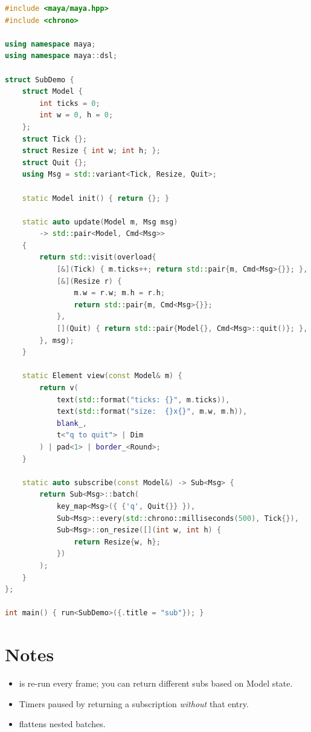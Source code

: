 \begin{lstlisting}[language=C++]
#include <maya/maya.hpp>
#include <chrono>

using namespace maya;
using namespace maya::dsl;

struct SubDemo {
    struct Model {
        int ticks = 0;
        int w = 0, h = 0;
    };
    struct Tick {};
    struct Resize { int w; int h; };
    struct Quit {};
    using Msg = std::variant<Tick, Resize, Quit>;

    static Model init() { return {}; }

    static auto update(Model m, Msg msg)
        -> std::pair<Model, Cmd<Msg>>
    {
        return std::visit(overload{
            [&](Tick) { m.ticks++; return std::pair{m, Cmd<Msg>{}}; },
            [&](Resize r) {
                m.w = r.w; m.h = r.h;
                return std::pair{m, Cmd<Msg>{}};
            },
            [](Quit) { return std::pair{Model{}, Cmd<Msg>::quit()}; },
        }, msg);
    }

    static Element view(const Model& m) {
        return v(
            text(std::format("ticks: {}", m.ticks)),
            text(std::format("size:  {}x{}", m.w, m.h)),
            blank_,
            t<"q to quit"> | Dim
        ) | pad<1> | border_<Round>;
    }

    static auto subscribe(const Model&) -> Sub<Msg> {
        return Sub<Msg>::batch(
            key_map<Msg>({ {'q', Quit{}} }),
            Sub<Msg>::every(std::chrono::milliseconds(500), Tick{}),
            Sub<Msg>::on_resize([](int w, int h) {
                return Resize{w, h};
            })
        );
    }
};

int main() { run<SubDemo>({.title = "sub"}); }
\end{lstlisting}

\section{Notes}

\begin{itemize}[leftmargin=*]
  \item {} is re-run every frame; you can
    return different subs based on Model state.
  \item Timers paused by returning a subscription \emph{without}
    that  entry.
  \item {} flattens nested batches.
\end{itemize}

